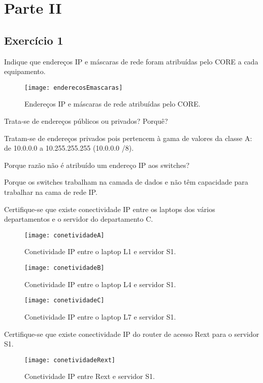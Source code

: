 \documentclass{exam}
\begin{document}
\section{Parte II}
\subsection{Exercício 1}
\begin{questions}

\question Indique que endereços IP e máscaras de rede foram atribuídas pelo CORE 
a cada equipamento.
\begin{figure}[H]
\centering\texttt{[image: enderecosEmascaras]} 
\caption{\label{fig:controller}Endereços IP e máscaras de rede atribuídas pelo CORE.}
\end{figure} 

\question Trata-se de endereços públicos ou privados? Porquê?
\begin{solution}
Tratam-se de endereços privados pois pertencem à gama de valores da classe A: de 10.0.0.0 a 10.255.255.255 (10.0.0.0 /8).
\end{solution}	

\question Porque razão não é atribuído um endereço IP aos switches?
\begin{solution}
Porque os switches trabalham na camada de dados e não têm capacidade para trabalhar na cama de rede IP.
\end{solution}	

\question Certifique-se	que	existe conectividade IP entre os laptops dos vários departamentos e	o servidor do departamento C.
\begin{solution}
\begin{figure}[H]
\centering\texttt{[image: conetividadeA]} 
\caption{\label{fig:controller}Conetividade IP entre o laptop L1 e servidor S1.}
\end{figure} 
\begin{figure}[H]
\centering\texttt{[image: conetividadeB]} 
\caption{\label{fig:controller}Conetividade IP entre o laptop L4 e servidor S1.}
\end{figure} 
\begin{figure}[H]
\centering\texttt{[image: conetividadeC]} 
\caption{\label{fig:controller}Conetividade IP entre o laptop L7 e servidor S1.}
\end{figure} 
\end{solution}

\question Certifique-se	que	existe conectividade IP do router de acesso Rext para o servidor S1.
\begin{solution}
\begin{figure}[H]
\centering\texttt{[image: conetividadeRext]} 
\caption{\label{fig:controller}Conetividade IP entre Rext e servidor S1.}
\end{figure} 
\end{solution}

\end{questions}
\end{document}
